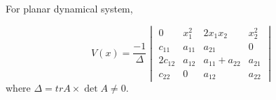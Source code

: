 \documentclass{tufte-handout}
\begin{document}
For planar dynamical system, 

\[ V(x)
=
\frac{-1}{\Delta}
\begin{vmatrix}
	0 &	x_1^2 & 2 x_1x_2 & x_2^2 \\
	c_{11} & a_{11} & a_{21} & 0 \\
	2c_{12} & a_{12} & a_{11} + a_{22} & a_{21} \\
	c_{22} & 0 & a_{12} & a_{22}
\end{vmatrix}
\]
where $\Delta = tr A \times \det A \neq 0.$



\end{document}
